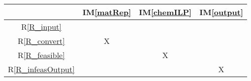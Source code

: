 \documentclass[12pt]{article}
\newcommand{\imref}[1]{IM\ref{#1}}
\newcommand{\rref}[1]{R\ref{#1}}
\newcommand{\nfrref}[1]{NFR\ref{#1}}
\begin{document}
\begin{table}[h!]
  \parbox{.45\linewidth}{
    \centering
    \begin{tabular}{|c|c|c|c|}%
      \hline
                                     & \imref{matRep} & \imref{chemILP} & \imref{output} \\ %
      \hline
      \rref{R_input}                 &                &                 &                \\ \hline %
      \rref{R_convert}               & X              &                 &                \\ \hline %
      \rref{R_feasible}              &                & X               &                \\ \hline %
      \rref{R_infeasOutput}          &                &                 & X              \\ \hline %

\end{tabular}}
\end{table}
\end{document}

